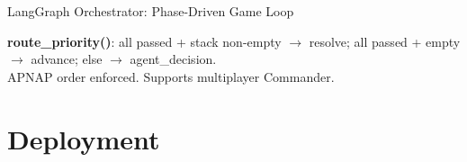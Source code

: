 \documentclass[aspectratio=169, 10pt]{beamer}
\begin{document}
\begin{frame}[fragile]{LangGraph Orchestrator: Phase-Driven Game Loop}
\begin{center}
  \end{center}
  \vspace{0.15cm}
  \begin{center}\footnotesize
    \textbf{route\_priority()}: all passed + stack non-empty $\to$ resolve;
    all passed + empty $\to$ advance; else $\to$ agent\_decision.\\
    APNAP order enforced. Supports multiplayer Commander.
  \end{center}
\end{frame}


\section{Deployment}
\end{document}

